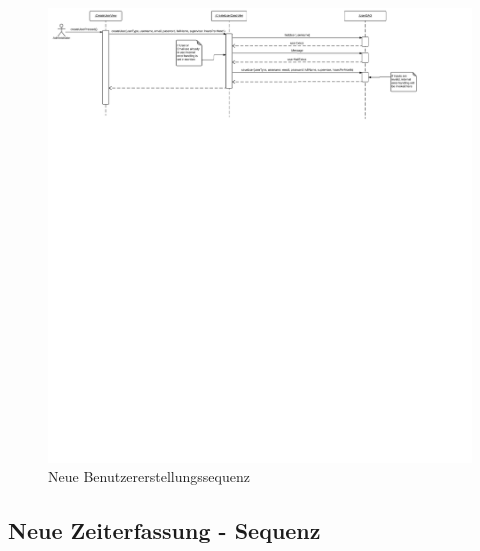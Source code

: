 \begin{figure}
  \centering
    \includegraphics[width=\linewidth]{Create-user-account-new.svg}
   \caption{Neue Benutzererstellungssequenz}
\end{figure}

\subsection{Neue Zeiterfassung - Sequenz}

